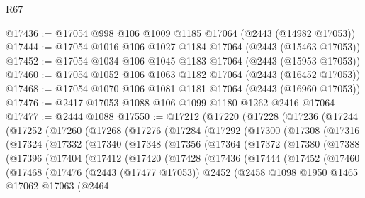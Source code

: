 \begin{lexlean}{R67}
\begin{coremodule}
@17436 := @17054 @998 @106 @1009 @1185 @17064 (@2443 (@14982 @17053))
@17444 := @17054 @1016 @106 @1027 @1184 @17064 (@2443 (@15463 @17053))
@17452 := @17054 @1034 @106 @1045 @1183 @17064 (@2443 (@15953 @17053))
@17460 := @17054 @1052 @106 @1063 @1182 @17064 (@2443 (@16452 @17053))
@17468 := @17054 @1070 @106 @1081 @1181 @17064 (@2443 (@16960 @17053))
@17476 := @2417 @17053 @1088 @106 @1099 @1180 @1262 @2416 @17064
@17477 := @2444 @1088
@17550 := @17212
    (@17220
      (@17228
        (@17236
          (@17244
            (@17252
              (@17260
                (@17268
                  (@17276
                    (@17284
                      (@17292
                        (@17300
                          (@17308
                            (@17316
                              (@17324
                                (@17332
                                  (@17340
                                    (@17348
                                      (@17356
                                        (@17364
                                          (@17372
                                            (@17380
                                              (@17388
                                                (@17396
                                                  (@17404
                                                    (@17412
                                                      (@17420
                                                        (@17428
                                                          (@17436
                                                            (@17444
                                                              (@17452
                                                                (@17460
                                                                  (@17468
                                                                    (@17476
                                                                      (@2443 (@17477 @17053))
                                                                      @2452
                                                                      (@2458
                                                                        @1098
                                                                        @1950
                                                                        @1465
                                                                        @17062
                                                                        @17063
                                                                        (@2464

\end{coremodule}
\end{lexlean}
